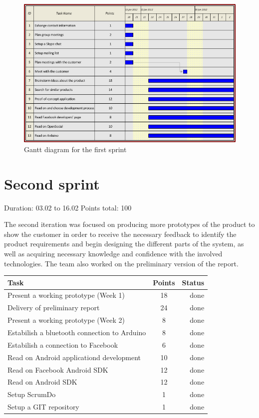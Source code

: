 \begin{figure}[h!]
\centering \includegraphics[scale=0.8]{img/sprints-gantt1.png}
\caption{Gantt diagram for the first sprint}
\label{fig:sprints-gantt1}
\end{figure}

\newpage


\section{Second sprint}

Duration: 03.02 to 16.02
Points total: 100

The second iteration was focused on producing more prototypes of the product to
show the customer in order to receive the necessary feedback to identify
the product requirements and begin designing the different parts of the system,
as well as acquiring necessary knowledge and confidence with the involved
technologies. The team also worked on the preliminary version of the report.

\begin{table}[ht!]
\begin{tabular}{ | l | c | r | }

\hline
\textbf{Task} & \textbf{Points} & \textbf{Status} \\
\hline

Present a working prototype	(Week 1)			& 18 & done \\
\hline
Delivery of preliminary report					& 24 & done \\
\hline
Present a working prototype	(Week 2)			& 8  & done \\
\hline
Estabilish a bluetooth connection to Arduino	& 8  & done \\
\hline
Estabilish a connection to Facebook				& 6  & done \\
\hline
Read on Android applicationd development		& 10 & done \\
\hline
Read on Facebook Android SDK					& 12 & done \\
\hline
Read on Android SDK								& 12 & done \\
\hline
Setup ScrumDo									& 1  & done \\
\hline
Setup a GIT repository							& 1  & done \\
\hline

\end{tabular}
\end{table}

